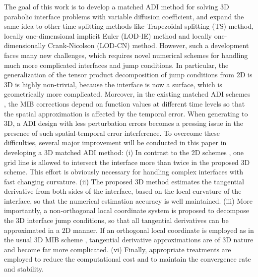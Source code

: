 \documentclass[dissertation]{uathesis}
\begin{document}
\begin{body}
\begin{flushleft}
\hspace{1cm} The goal of this work is to develop a matched ADI method for solving 3D parabolic interface problems with variable diffusion coefficient, and expand the same idea to other time splitting methods like Trapezoidal splitting (TS) method, locally one-dimensional implicit Euler (LOD-IE) method and locally one-dimensionally Crank-Nicolson (LOD-CN) method. However, such a development faces many new challenges, which requires novel numerical schemes for handling much more complicated interfaces and jump conditions. In particular, the generalization of the tensor product decomposition of jump conditions from 2D is 3D is highly non-trivial, because the interface is now a surface, which is geometrically more complicated. Moreover, in the existing matched ADI schemes \cite{zhao2015matched,li2017matched}, the MIB corrections depend on function values at different time levels so that the spatial approximation is affected by the temporal error. When generating to 3D, a ADI design with less perturbation errors becomes a pressing issue in the presence of such spatial-temporal error interference. 
To overcome these difficulties, several major improvement will be conducted in this paper in developing a 3D matched ADI method: 
(i) In contrast to the 2D schemes  \cite{zhao2015matched,li2017matched}, one grid line is allowed to intersect the interface more than twice in the proposed 3D scheme. This effort is obviously necessary for handling complex interfaces with fast changing curvature. (ii) The proposed 3D method estimates the tangential derivative from both sides of the interface, based on the local curvature of the interface, so that the numerical estimation accuracy is well maintained. 
(iii) More importantly, a non-orthogonal local coordinate system is proposed to decompose the 3D interface jump conditions, so that all tangential derivatives can be approximated in a 2D manner. If an orthogonal local coordinate is employed as in the usual  3D  MIB scheme \cite{yu2007three}, tangential derivative approximations are of 3D nature and become far more complicated. (vi) Finally, appropriate treatments are employed to reduce the computational cost and to maintain the convergence rate and stability.


\end{flushleft}
\end{body}
\end{document}
